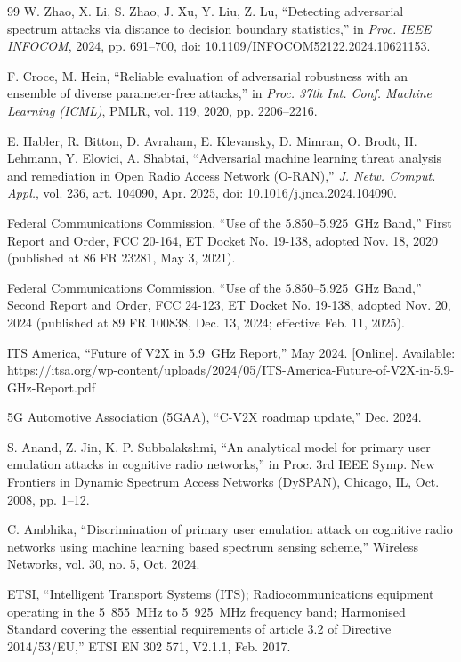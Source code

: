 \documentclass[review]{elsarticle}
\begin{document}
\begin{thebibliography}{99}
 W. Zhao, X. Li, S. Zhao, J. Xu, Y. Liu, Z. Lu,
``Detecting adversarial spectrum attacks via distance to decision boundary
statistics,'' in \emph{Proc. IEEE INFOCOM}, 2024, pp. 691--700,
doi: 10.1109/INFOCOM52122.2024.10621153.

 F. Croce, M. Hein, ``Reliable evaluation of adversarial
robustness with an ensemble of diverse parameter-free attacks,'' in
\emph{Proc. 37th Int. Conf. Machine Learning (ICML)}, PMLR, vol. 119, 2020,
pp. 2206--2216.

 E. Habler, R. Bitton, D. Avraham, E. Klevansky,
D. Mimran, O. Brodt, H. Lehmann, Y. Elovici, A. Shabtai, ``Adversarial
machine learning threat analysis and remediation in Open Radio Access
Network (O-RAN),'' \emph{J. Netw. Comput. Appl.}, vol. 236, art. 104090,
Apr. 2025, doi: 10.1016/j.jnca.2024.104090.

 Federal Communications Commission, ``Use of the
5.850--5.925~GHz Band,'' First Report and Order, FCC 20-164, ET Docket
No. 19-138, adopted Nov. 18, 2020 (published at 86 FR 23281, May 3, 2021).

 Federal Communications Commission, ``Use of the
5.850--5.925~GHz Band,'' Second Report and Order, FCC 24-123, ET Docket
No. 19-138, adopted Nov. 20, 2024 (published at 89 FR 100838, Dec. 13,
2024; effective Feb. 11, 2025).

 ITS America, ``Future of V2X in 5.9~GHz Report,''
May 2024. [Online]. Available:
https://itsa.org/wp-content/uploads/2024/05/ITS-America-Future-of-V2X-in-5.9-GHz-Report.pdf

 5G Automotive Association (5GAA), ``C-V2X roadmap
update,'' Dec. 2024.

 S. Anand, Z. Jin, K. P. Subbalakshmi, ``An analytical
model for primary user emulation attacks in cognitive radio networks,'' in
Proc. 3rd IEEE Symp. New Frontiers in Dynamic Spectrum Access Networks
(DySPAN), Chicago, IL, Oct. 2008, pp. 1--12.

 C. Ambhika, ``Discrimination of primary user
emulation attack on cognitive radio networks using machine learning based
spectrum sensing scheme,'' Wireless Networks, vol. 30, no. 5, Oct. 2024.

 ETSI, ``Intelligent Transport Systems (ITS);
Radiocommunications equipment operating in the 5~855~MHz to 5~925~MHz
frequency band; Harmonised Standard covering the essential requirements of
article 3.2 of Directive 2014/53/EU,'' ETSI EN 302 571, V2.1.1, Feb. 2017.


\end{thebibliography}
\end{document}
